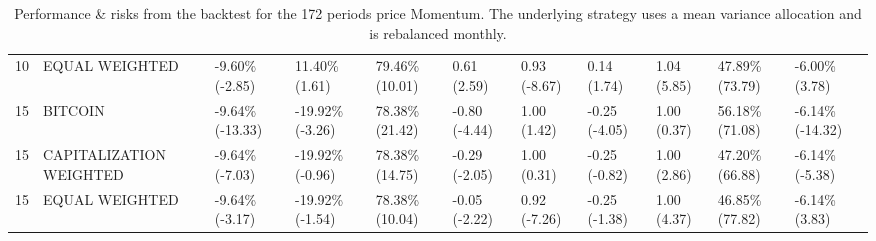 \documentclass{article}
\begin{document}
\begin{landscape}
\begin{table}[H]
\begin{tabular}{p{0.4cm}|p{3cm}|p{1.65cm}|p{1.65cm}|p{1.65cm}|p{1.65cm}|p{1.65cm}|p{1.65cm}|p{1.65cm}|p{1.65cm}|p{1.65cm}}
\\ 
10&EQUAL WEIGHTED&-9.60\% (-2.85)&11.40\% (1.61)&79.46\% (10.01)&0.61 (2.59)&0.93 (-8.67)&0.14 (1.74)&1.04 (5.85)&47.89\% (73.79)&-6.00\% (3.78)
\\ 
15&BITCOIN&-9.64\% (-13.33)&-19.92\% (-3.26)&78.38\% (21.42)&-0.80 (-4.44)&1.00 (1.42)&-0.25 (-4.05)&1.00 (0.37)&56.18\% (71.08)&-6.14\% (-14.32)
\\ 
15&CAPITALIZATION WEIGHTED&-9.64\% (-7.03)&-19.92\% (-0.96)&78.38\% (14.75)&-0.29 (-2.05)&1.00 (0.31)&-0.25 (-0.82)&1.00 (2.86)&47.20\% (66.88)&-6.14\% (-5.38)
\\ 
15&EQUAL WEIGHTED&-9.64\% (-3.17)&-19.92\% (-1.54)&78.38\% (10.04)&-0.05 (-2.22)&0.92 (-7.26)&-0.25 (-1.38)&1.00 (4.37)&46.85\% (77.82)&-6.14\% (3.83)
\\
\bottomrule
  \end{tabular}
  \label{tab:mom172meanvar}
   \caption{Performance \& risks from the backtest for the 172 periods price Momentum. The underlying strategy uses a mean variance allocation and is rebalanced monthly.}
\end{table}
\end{landscape}
\end{document}
